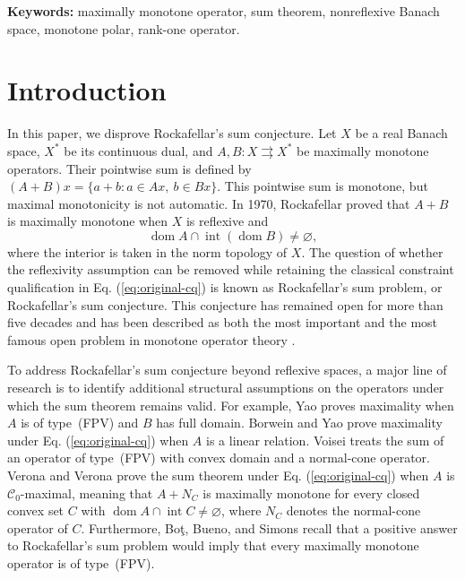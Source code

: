 \documentclass[11pt]{article}
\newcommand{\dom}{\operatorname{dom}}
\theoremstyle{definition}
\theoremstyle{remark}
\begin{document}
\noindent\textbf{Keywords:} maximally monotone operator, sum theorem,
nonreflexive Banach space, monotone polar, rank-one operator.




\section{Introduction}
\label{sec:introduction}
In this paper, we disprove Rockafellar's sum conjecture. 
Let $X$ be a real Banach space, $X^*$ be its continuous dual, and $A,B:X\rightrightarrows X^*$ be maximally monotone operators. Their pointwise sum is defined by $(A+B)x=\{a+b:a\in Ax,\ b\in Bx\}$. This pointwise sum is monotone, but maximal monotonicity is not automatic.  
In 1970, Rockafellar \cite{rockafellar1970} proved that $A+B$ is maximally monotone when $X$ is reflexive and
\begin{equation}
\dom A\cap\operatorname{int}(\dom B)\ne\varnothing,
\label{eq:original-cq}
\end{equation}
where the interior is taken in the norm topology of $X$. 
The question of whether the reflexivity assumption can be removed while retaining the classical constraint qualification in Eq. (\ref{eq:original-cq}) is known as Rockafellar's sum problem, or Rockafellar's sum conjecture. This conjecture has remained open for more than five decades and has been described as both the most important and the most famous open problem in monotone operator theory \cite{yao2010,borweinyao2012}. 









To address Rockafellar's sum conjecture beyond reflexive spaces, a major line of research is to identify additional structural assumptions on the operators under which the sum theorem remains valid. 
For example, Yao \cite{yao2010} proves maximality when $A$ is of type~(FPV) and $B$ has full domain. Borwein and Yao \cite{borweinyao2012} prove maximality under Eq. (\ref{eq:original-cq}) when $A$ is a linear relation. Voisei \cite{voisei2010} treats the sum of an operator of type~(FPV) with convex domain and a normal-cone operator. Verona and Verona \cite{veronaverona2022} prove the sum theorem under Eq. (\ref{eq:original-cq}) when $A$ is $\mathcal C_0$-maximal, meaning that  $A+N_C$ is maximally monotone for every closed convex set $C$ with $\dom A\cap\operatorname{int}C\ne\varnothing$, where $N_C$ denotes the normal-cone operator of $C$. 
Furthermore, Bo\c{t}, Bueno, and Simons \cite{botbuenosimons2016} recall that a positive answer to Rockafellar's sum problem would imply that every maximally monotone operator is of type~(FPV). 
\end{document}
